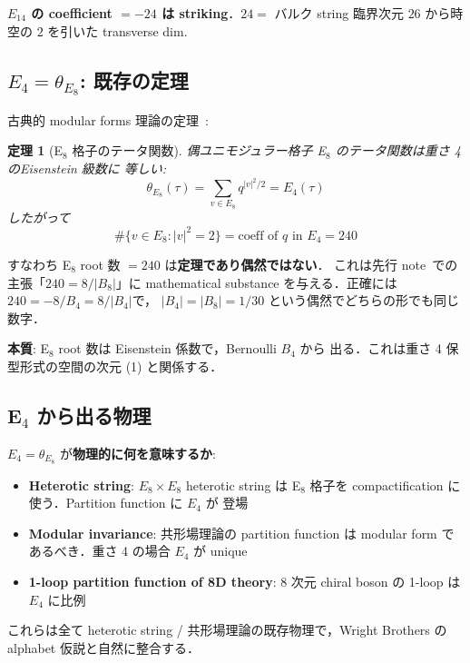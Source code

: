 \documentclass[11pt,a4paper]{article}
\newtheorem{theorem}{定理}
\begin{document}
\textbf{$E_{14}$ の coefficient $= -24$ は striking}．$24 = $ バルク
string 臨界次元 $26$ から時空の $2$ を引いた transverse dim.

\subsection{$E_4 = \theta_{E_8}$: 既存の定理}

古典的 modular forms 理論の定理~\cite{Serre1973}:
\begin{theorem}[E$_8$ 格子のテータ関数]
偶ユニモジュラー格子 E$_8$ のテータ関数は重さ 4 のEisenstein 級数に
等しい:
\begin{equation}
\theta_{E_8}(\tau) = \sum_{v \in E_8} q^{|v|^2/2} = E_4(\tau)
\end{equation}
したがって
\begin{equation}
\#\{v \in E_8 : |v|^2 = 2\} = \text{coeff of }q\text{ in }E_4 = 240
\end{equation}
\end{theorem}

すなわち E$_8$ root 数 $= 240$ は\textbf{定理であり偶然ではない}．
これは先行 note~\cite{b2-deeper}での主張「$240 = 8/|B_8|$」に
mathematical substance を与える．正確には $240 = -8/B_4 = 8/|B_4|$で，
$|B_4| = |B_8| = 1/30$ という偶然でどちらの形でも同じ数字．

\textbf{本質}: E$_8$ root 数は Eisenstein 係数で，Bernoulli $B_4$ から
出る．これは重さ 4 保型形式の空間の次元 (1) と関係する．

\subsection{E$_4$ から出る物理}

$E_4 = \theta_{E_8}$ が\textbf{物理的に何を意味するか}:
\begin{itemize}
\item \textbf{Heterotic string}: $E_8 \times E_8$ heterotic string は
E$_8$ 格子を compactification に使う．Partition function に $E_4$ が
登場~\cite{GSW1987}
\item \textbf{Modular invariance}: 共形場理論の partition function は
modular form であるべき．重さ 4 の場合 $E_4$ が unique
\item \textbf{1-loop partition function of 8D theory}: 8 次元 chiral
boson の 1-loop は $E_4$ に比例
\end{itemize}

これらは全て heterotic string / 共形場理論の既存物理で，Wright Brothers
の alphabet 仮説と自然に整合する．
\end{document}
